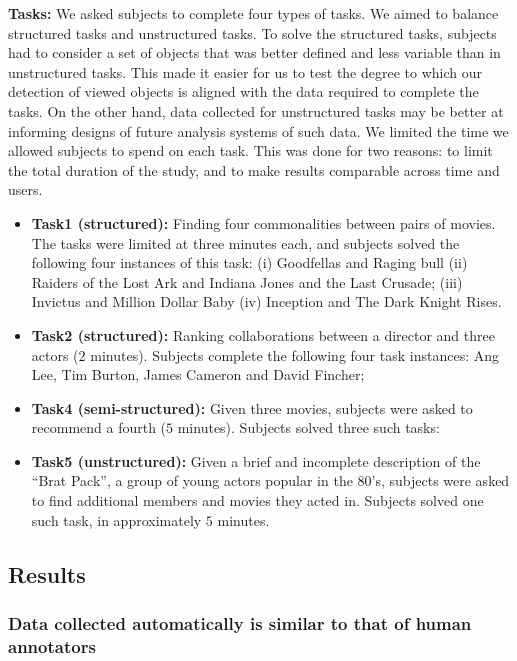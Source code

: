 \textbf{Tasks:} We asked subjects to complete four types of tasks. We aimed to balance structured tasks and unstructured tasks. To solve the structured tasks, subjects had to consider a set of objects that was better defined and less variable than in unstructured tasks. This made it easier for us to test the degree to which our detection of viewed objects is aligned with the data required to complete the tasks. On the other hand, data collected for unstructured tasks may be better at informing designs of future analysis systems of such data. We limited the time we allowed subjects to spend on each task. This was done for two reasons: to limit the total duration of the study, and to make results comparable across time and users.

\begin{itemize}
\item \textbf{Task1 (structured):} Finding four commonalities between pairs of movies. The tasks were limited at three minutes each, and subjects solved the following four instances of this task: (i) Goodfellas and Raging bull (ii) Raiders of the Lost Ark and Indiana Jones and the Last Crusade; (iii) Invictus and Million Dollar Baby (iv) Inception and The Dark Knight Rises.  
\item \textbf{Task2 (structured):} Ranking collaborations between a director and three actors ($2$ minutes).  Subjects complete the following four task instances: Ang Lee, Tim Burton, James Cameron and David Fincher; 
\item \textbf{Task4 (semi-structured):} Given three movies, subjects were asked to recommend a fourth ($5$ minutes). Subjects solved three such tasks: 
\item \textbf{Task5 (unstructured):} Given a brief and incomplete description of the ``Brat Pack'', a group of young actors popular in the 80's, subjects were asked to find additional members and movies they acted in. Subjects solved one such task, in approximately $5$ minutes. 
\end{itemize}

\subsection{Results}
\subsubsection{Data collected automatically is similar to that of human annotators}
\label{sec:EvalResults}

